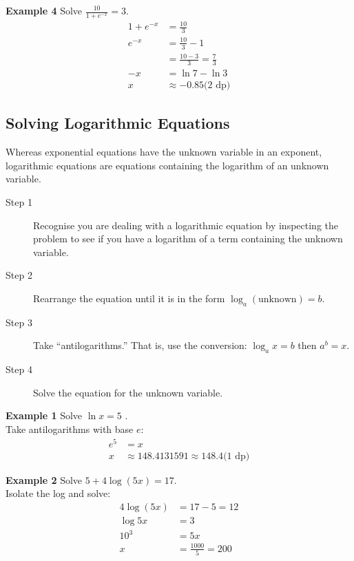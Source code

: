 \textbf{Example 4} Solve $\frac{10}{1 +e^{ -x}} =3$.\medskip\\
\solution
\begin{align*}1 +e^{ -x} &  = \frac{10}{3} \\
e^{ -x} &  = \frac{10}{3} -1 \\
&  = \frac{10 -3}{3} =\frac{7}{3} \\
-x &  = \ln  7 -\ln  3 \\
x &  \approx  -0.85\text{(2 dp)}\end{align*}


\subsection*{Solving Logarithmic Equations}
Whereas exponential equations have the unknown variable in an exponent, logarithmic equations are equations containing the logarithm of an unknown variable. 
\begin{tcolorbox}
\begin{description}
	\item [Step 1] Recognise you are dealing with a logarithmic equation by inspecting the problem to see if you have a logarithm of a term containing the unknown variable. 	
	\item [Step	2] Rearrange the equation until it is in the form $\log _{a} \left (\text{unknown}\right ) =b$. 	
	\item [Step 3] Take	``antilogarithms.'' That is, use the conversion: $\log _{a}x=b$ then $a^b=x$. 	
	\item [Step 4] Solve the equation for the unknown variable.
\end{description}
\end{tcolorbox}


\textbf{Example 1} Solve $\ln  x =5$ .\medskip\\
\solution Take antilogarithms with base $e$:
\begin{align*}e^{5} &  = x \\
x &  \approx 148.4131591 \approx 148.4\text{(1 dp)}\end{align*}

\textbf{Example 2} Solve $5 +4 \log  \left (5 x\right ) =17$.\medskip\\
\solution Isolate the log and solve:
\begin{align*}4 \log  \left (5 x\right ) &  = 17 -5 =12 \\
\log  5 x &  = 3 \\
\text{}10^{3} &  = 5 x \\
x &  = \frac{1000}{5} =200\end{align*}

